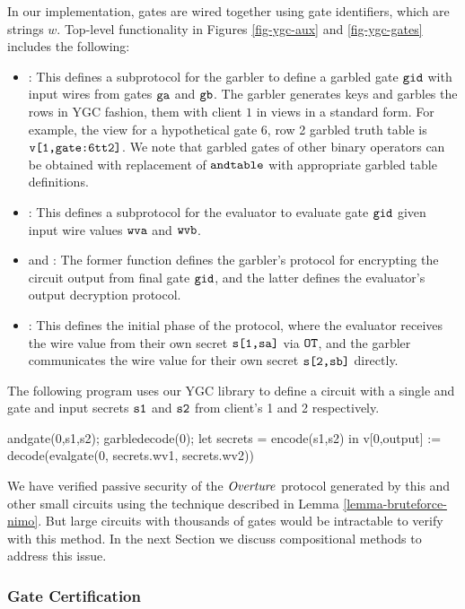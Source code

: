 In our implementation, gates are wired together using gate
identifiers, which are strings $w$. Top-level functionality in Figures
\ref{fig-ygc-aux} and \ref{fig-ygc-gates} includes the following:
\begin{itemize}
\item {}: This defines a subprotocol for the garbler
  to define a garbled gate $\texttt{gid}$ with input wires from gates
  $\texttt{ga}$ and $\texttt{gb}$. The garbler generates keys and garbles
  the rows in YGC fashion, them with client $1$ in
  views in a standard form. For example, the view for
  a hypothetical gate 6, row 2 garbled truth table is $\texttt{v[1,gate:6tt2]}$.
  We note that garbled gates of other binary operators can be obtained with
  replacement of $\texttt{andtable}$ with appropriate garbled table definitions. 
\item {}: This defines a subprotocol for the evaluator to
  evaluate gate $\texttt{gid}$ given input wire values $\texttt{wva}$ and
  $\texttt{wvb}$.
\item {} and : The former function
  defines the garbler's protocol for encrypting the circuit
  output from final gate $\texttt{gid}$, and the latter defines
  the evaluator's output decryption protocol.
\item {}: This defines the initial phase of the protocol,
  where the evaluator receives the wire value from their own
  secret $\texttt{s[1,sa]}$ via $\texttt{OT}$, and the garbler communicates
  the wire value for their own secret $\texttt{s[2,sb]}$ directly.
\end{itemize}
\begin{example}
  \label{example-andcircuit}
The following program uses our YGC library to define
a circuit with a single and gate and input secrets $\texttt{s1}$ and
$\texttt{s2}$ from client's 1 and 2 respectively. 
\begin{verbatimtab}
  andgate(0,s1,s2);
  garbledecode(0);
  let secrets = encode(s1,s2) in
  v[0,output] := decode(evalgate(0, secrets.wv1, secrets.wv2))
\end{verbatimtab}
\end{example}
We have verified passive security of the $\mathit{Overture}$ protocol
generated by this and other small circuits using the
technique described in Lemma \ref{lemma-bruteforce-nimo}.
But large circuits with thousands of gates would be
intractable to verify with this method. In the next Section
we discuss compositional methods to address this issue.

\subsubsection{Gate Certification}
\label{section-ygc-certification}

